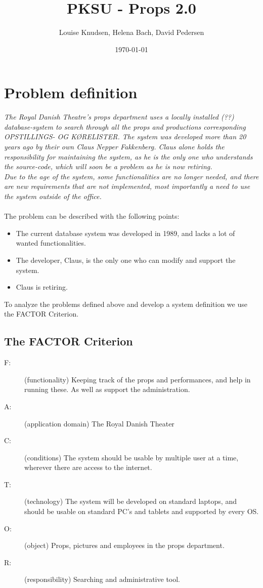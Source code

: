 \documentclass[12pt]{article}
\title{PKSU - Props 2.0}
\author{Louise Knudsen, Helena Bach, David Pedersen}
\date{\today}
\begin{document}
\maketitle
\section{Problem definition}
\textit{The Royal Danish Theatre's props department uses a locally installed (??) database-system to search through all the props and productions corresponding OPSTILLINGS- OG KØRELISTER. The system was developed more than 20 years ago by their own Claus Nepper Fakkenberg. Claus alone holds the responsibility for maintaining the system, as he is the only one who understands the source-code, which will soon be a problem as he is now retiring. \\
Due to the age of the system, some functionalities are no longer needed, and there are new requirements that are not implemented, most importantly a need to use the system outside of the office.} \\\\
The problem can be described with the following points:
\begin{itemize}
\item The current database system was developed in 1989, and lacks a lot of wanted functionalities.
\item The developer, Claus, is the only one who can modify and support the system.
\item Claus is retiring.
\end{itemize}
To analyze the problems defined above and develop a system definition we use the FACTOR Criterion.
\subsection{The FACTOR Criterion}
\begin{description}
\item[F:] (functionality) Keeping track of the props and performances, and help in running these. As well as support the administration. 
\item[A:] (application domain) The Royal Danish Theater 
\item[C:] (conditions) The system should be usable by multiple user at a time, wherever there are access to the internet. 
\item[T:] (technology) The system will be developed on standard laptops, and should be usable on standard PC's and tablets and supported by every OS. 
\item[O:] (object) Props, pictures and employees in the props department. 
\item[R:](responsibility) Searching and administrative tool.
\end{description}
\end{document}
